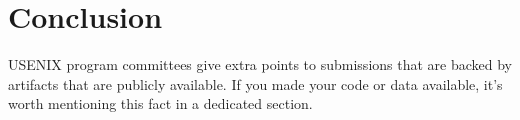 \section*{Conclusion}

USENIX program committees give extra points to submissions that are
backed by artifacts that are publicly available. If you made your code
or data available, it's worth mentioning this fact in a dedicated
section.






